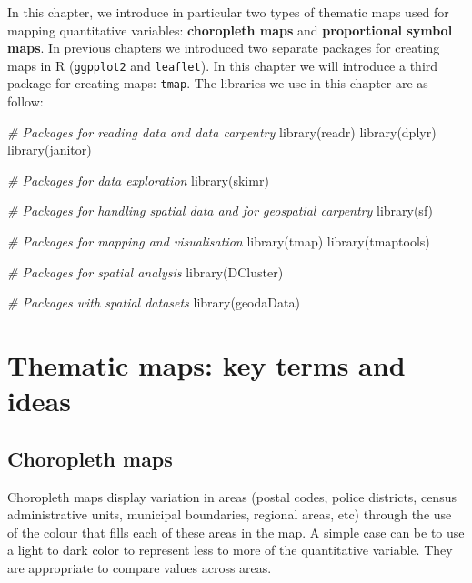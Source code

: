 \documentclass[
]{book}
\newenvironment{Shaded}{\begin{snugshade}}{\end{snugshade}}
\newcommand{\CommentTok}[1]{\textcolor[rgb]{0.56,0.35,0.01}{\textit{#1}}}
\newcommand{\FunctionTok}[1]{\textcolor[rgb]{0.00,0.00,0.00}{#1}}
\newcommand{\NormalTok}[1]{#1}
\begin{document}
In this chapter, we introduce in particular two types of thematic maps used for mapping quantitative variables: \textbf{choropleth maps} and \textbf{proportional symbol maps}. In previous chapters we introduced two separate packages for creating maps in R (\texttt{ggpplot2} and \texttt{leaflet}). In this chapter we will introduce a third package for creating maps: \texttt{tmap}. The libraries we use in this chapter are as follow:

\begin{Shaded}
\begin{Highlighting}[]
\CommentTok{\# Packages for reading data and data carpentry}
\FunctionTok{library}\NormalTok{(readr)}
\FunctionTok{library}\NormalTok{(dplyr)}
\FunctionTok{library}\NormalTok{(janitor)}

\CommentTok{\# Packages for data exploration}
\FunctionTok{library}\NormalTok{(skimr)}

\CommentTok{\# Packages for handling spatial data and for geospatial carpentry}
\FunctionTok{library}\NormalTok{(sf)}

\CommentTok{\# Packages for mapping and visualisation}
\FunctionTok{library}\NormalTok{(tmap)}
\FunctionTok{library}\NormalTok{(tmaptools)}

\CommentTok{\# Packages for spatial analysis}
\FunctionTok{library}\NormalTok{(DCluster)}

\CommentTok{\# Packages with spatial datasets}
\FunctionTok{library}\NormalTok{(geodaData)}
\end{Highlighting}
\end{Shaded}

\hypertarget{thematic-maps-key-terms-and-ideas}{%
\section{Thematic maps: key terms and ideas}\label{thematic-maps-key-terms-and-ideas}}

\hypertarget{choropleth-maps}{%
\subsection{Choropleth maps}\label{choropleth-maps}}

Choropleth maps display variation in areas (postal codes, police districts, census administrative units, municipal boundaries, regional areas, etc) through the use of the colour that fills each of these areas in the map. A simple case can be to use a light to dark color to represent less to more of the quantitative variable. They are appropriate to compare values across areas.
\end{document}
